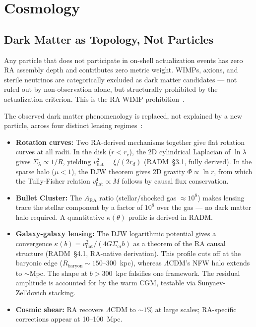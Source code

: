 \documentclass[11pt,a4paper]{article}
\begin{document}
\section{Cosmology}
\label{sec:cosmology}

\subsection{Dark Matter as Topology, Not Particles}

Any particle that does not participate in on-shell actualization events
has zero RA assembly depth and contributes zero metric weight. WIMPs,
axions, and sterile neutrinos are categorically excluded as dark matter
candidates --- not ruled out by non-observation alone, but structurally
prohibited by the actualization criterion. This is the RA WIMP
prohibition~\citep{Sandeman2026RAGC}.

The observed dark matter phenomenology is replaced, not explained by a
new particle, across four distinct lensing regimes~\citep{Sandeman2026RADM}:
\begin{itemize}[noitemsep]
  \item \textbf{Rotation curves:} Two RA-derived mechanisms together
  give flat rotation curves at all radii. In the disk ($r < r_c$),
  the 2D cylindrical Laplacian of $\ln\lambda$ gives $\Sigma_\lambda \propto 1/R$,
  yielding $v_\mathrm{flat}^2 = \xi/(2r_d)$ (RADM~\S3.1, fully derived).
  In the sparse halo ($\mu < 1$), the DJW theorem gives 2D gravity
  $\Phi \propto \ln r$, from which the Tully-Fisher relation
  $v_\mathrm{flat}^4 \propto M$ follows by causal flux conservation.
  \item \textbf{Bullet Cluster:} The $A_{\mathrm{RA}}$ ratio
  (stellar/shocked gas $\approx 10^8$) makes lensing trace the stellar
  component by a factor of $10^8$ over the gas --- no dark matter halo
  required. A quantitative $\kappa(\theta)$ profile is derived in RADM.
  \item \textbf{Galaxy-galaxy lensing:} The DJW logarithmic potential
  gives a convergence $\kappa(b) = v_\mathrm{flat}^2/(4G\Sigma_\mathrm{cr}b)$
  as a theorem of the RA causal structure (RADM~\S4.1, RA-native derivation).
  This profile cuts off at the baryonic edge ($R_\mathrm{baryon}\sim 150$--300~kpc),
  whereas $\Lambda$CDM's NFW halo extends to $\sim$Mpc.
  The shape at $b > 300$~kpc falsifies one framework. The residual amplitude
  is accounted for by the warm CGM, testable via Sunyaev-Zel'dovich stacking.
  \item \textbf{Cosmic shear:} RA recovers $\Lambda$CDM to $\sim1\%$
  at large scales; RA-specific corrections appear at 10--100~Mpc.
\end{itemize}
\end{document}
